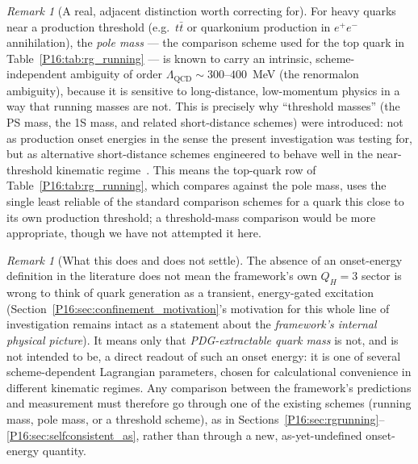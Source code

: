 \documentclass[11pt,a4paper]{article}
\theoremstyle{definition}\newtheorem{definition}[theorem]{Definition}
\theoremstyle{remark}
\newtheorem{remark}[theorem]{Remark}
\theoremstyle{definition}\newtheorem{construction}[theorem]{Construction}
\begin{document}
\begin{remark}[A real, adjacent distinction worth correcting for]
\label{P16:rem:pole_mass_caveat}
For heavy quarks near a production threshold (e.g.\ $t\bar t$ or
quarkonium production in $e^+e^-$ annihilation), the \emph{pole mass}
--- the comparison scheme used for the top quark in
Table~\ref{P16:tab:rg_running} --- is known to carry an intrinsic,
scheme-independent ambiguity of order $\Lambda_{\mathrm{QCD}}\sim300$--$400$~MeV
(the renormalon ambiguity), because it is sensitive to long-distance,
low-momentum physics in a way that running masses are not. This is
precisely why ``threshold masses'' (the PS mass, the 1S mass, and
related short-distance schemes) were introduced: not as production
onset energies in the sense the present investigation was testing for,
but as alternative short-distance schemes engineered to behave well
in the near-threshold kinematic regime~\cite{Hoang1999,Hoang2002,Beneke1998}.
This means the top-quark row of Table~\ref{P16:tab:rg_running}, which
compares against the pole mass, uses the single least reliable of the
standard comparison schemes for a quark this close to its own
production threshold; a threshold-mass comparison would be more
appropriate, though we have not attempted it here.
\end{remark}

\begin{remark}[What this does and does not settle]
\label{P16:rem:onset_energy_scope}
The absence of an onset-energy definition in the literature does not
mean the framework's own $Q_H=3$ sector is wrong to think of quark
generation as a transient, energy-gated excitation
(Section~\ref{P16:sec:confinement_motivation}'s motivation for this whole
line of investigation remains intact as a statement about the
\emph{framework's internal physical picture}). It means only that
\emph{PDG-extractable quark mass} is not, and is not intended to be,
a direct readout of such an onset energy: it is one of several
scheme-dependent Lagrangian parameters, chosen for calculational
convenience in different kinematic regimes. Any comparison between the
framework's predictions and measurement must therefore go through one
of the existing schemes (running mass, pole mass, or a threshold
scheme), as in Sections~\ref{P16:sec:rgrunning}--\ref{P16:sec:selfconsistent_as},
rather than through a new, as-yet-undefined onset-energy quantity.
\end{remark}

\end{document}
